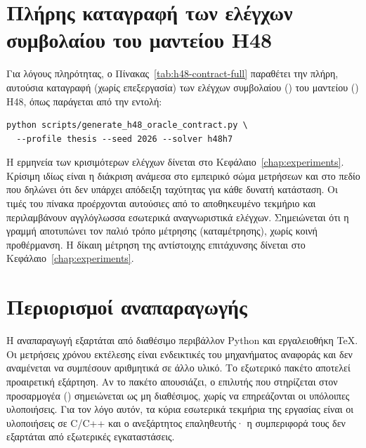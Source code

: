 \section{Πλήρης καταγραφή των ελέγχων συμβολαίου του μαντείου H48}
\label{sec:repro-contract}

Για λόγους πληρότητας, ο Πίνακας~\ref{tab:h48-contract-full} παραθέτει την πλήρη, αυτούσια καταγραφή (χωρίς επεξεργασία) των ελέγχων συμβολαίου () του μαντείου () H48, όπως παράγεται από την εντολή:
\begin{verbatim}
python scripts/generate_h48_oracle_contract.py \
  --profile thesis --seed 2026 --solver h48h7
\end{verbatim}
Η ερμηνεία των κρισιμότερων ελέγχων δίνεται στο Κεφάλαιο~\ref{chap:experiments}. Κρίσιμη ιδίως είναι η διάκριση ανάμεσα στο εμπειρικό σώμα μετρήσεων και στο πεδίο που δηλώνει ότι δεν υπάρχει απόδειξη ταχύτητας για κάθε δυνατή κατάσταση. Οι τιμές του πίνακα προέρχονται αυτούσιες από το αποθηκευμένο τεκμήριο και περιλαμβάνουν αγγλόγλωσσα εσωτερικά αναγνωριστικά ελέγχων. Σημειώνεται ότι η γραμμή  αποτυπώνει τον παλιό τρόπο μέτρησης (καταμέτρησης), χωρίς κοινή προθέρμανση. Η δίκαιη μέτρηση της αντίστοιχης επιτάχυνσης δίνεται στο Κεφάλαιο~\ref{chap:experiments}.

\begin{table}[htbp]\centering

\caption{Πλήρης καταγραφή των ελέγχων συμβολαίου του μαντείου H48 (), όπως παράγεται από το .}
\label{tab:h48-contract-full}
\end{table}

\section{Περιορισμοί αναπαραγωγής}
\label{sec:repro-limits}

Η αναπαραγωγή εξαρτάται από διαθέσιμο περιβάλλον Python και εργαλειοθήκη TeX. Οι μετρήσεις χρόνου εκτέλεσης είναι ενδεικτικές του μηχανήματος αναφοράς και δεν αναμένεται να συμπέσουν αριθμητικά σε άλλο υλικό. Το εξωτερικό πακέτο  \cite{muodovKociembaPkg} αποτελεί προαιρετική εξάρτηση. Αν το πακέτο απουσιάζει, ο επιλυτής που στηρίζεται στον προσαρμογέα () σημειώνεται ως μη διαθέσιμος, χωρίς να επηρεάζονται οι υπόλοιπες υλοποιήσεις. Για τον λόγο αυτόν, τα κύρια εσωτερικά τεκμήρια της εργασίας είναι οι υλοποιήσεις σε C/C++ και ο ανεξάρτητος επαληθευτής· η συμπεριφορά τους δεν εξαρτάται από εξωτερικές εγκαταστάσεις.
